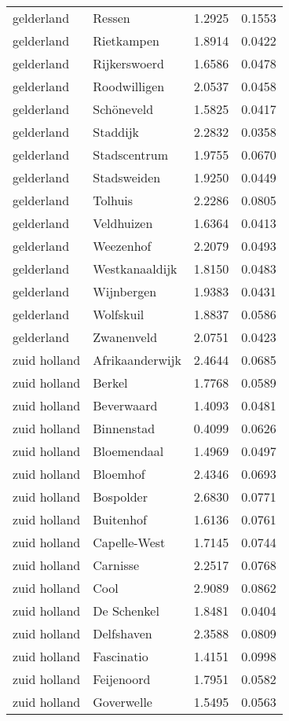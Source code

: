 \begin{longtable}{llcc}
gelderland & Ressen & 1.2925 & 0.1553 \\
gelderland & Rietkampen & 1.8914 & 0.0422 \\
gelderland & Rijkerswoerd & 1.6586 & 0.0478 \\
gelderland & Roodwilligen & 2.0537 & 0.0458 \\
gelderland & Schöneveld & 1.5825 & 0.0417 \\
gelderland & Staddijk & 2.2832 & 0.0358 \\
gelderland & Stadscentrum & 1.9755 & 0.0670 \\
gelderland & Stadsweiden & 1.9250 & 0.0449 \\
gelderland & Tolhuis & 2.2286 & 0.0805 \\
gelderland & Veldhuizen & 1.6364 & 0.0413 \\
gelderland & Weezenhof & 2.2079 & 0.0493 \\
gelderland & Westkanaaldijk & 1.8150 & 0.0483 \\
gelderland & Wijnbergen & 1.9383 & 0.0431 \\
gelderland & Wolfskuil & 1.8837 & 0.0586 \\
gelderland & Zwanenveld & 2.0751 & 0.0423 \\
zuid holland & Afrikaanderwijk & 2.4644 & 0.0685 \\
zuid holland & Berkel & 1.7768 & 0.0589 \\
zuid holland & Beverwaard & 1.4093 & 0.0481 \\
zuid holland & Binnenstad & 0.4099 & 0.0626 \\
zuid holland & Bloemendaal & 1.4969 & 0.0497 \\
zuid holland & Bloemhof & 2.4346 & 0.0693 \\
zuid holland & Bospolder & 2.6830 & 0.0771 \\
zuid holland & Buitenhof & 1.6136 & 0.0761 \\
zuid holland & Capelle-West & 1.7145 & 0.0744 \\
zuid holland & Carnisse & 2.2517 & 0.0768 \\
zuid holland & Cool & 2.9089 & 0.0862 \\
zuid holland & De Schenkel & 1.8481 & 0.0404 \\
zuid holland & Delfshaven & 2.3588 & 0.0809 \\
zuid holland & Fascinatio & 1.4151 & 0.0998 \\
zuid holland & Feijenoord & 1.7951 & 0.0582 \\
zuid holland & Goverwelle & 1.5495 & 0.0563 \\

\end{longtable}
